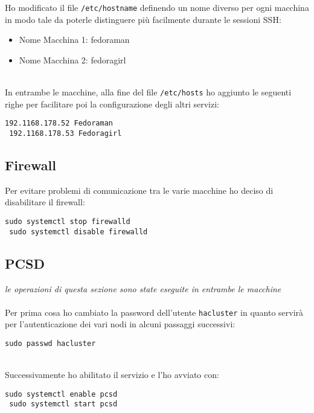 Ho modificato il file \lstinline[style=cmd]|/etc/hostname| definendo un nome diverso per ogni macchina in modo tale da poterle distinguere pi\`{u} facilmente durante le sessioni SSH: 

\begin{itemize}
	\item Nome Macchina 1: fedoraman
	\item Nome Macchina 2: fedoragirl
\end{itemize}
\ \\
In entrambe le macchine, alla fine del file \lstinline[style=cmd]|/etc/hosts| ho aggiunto le seguenti righe per facilitare poi la configurazione degli altri servizi:

\begin{lstlisting}[style=cmd]
 192.1168.178.52 Fedoraman
 192.1168.178.53 Fedoragirl
\end{lstlisting}

\subsection{Firewall}

Per evitare problemi di comunicazione tra le varie macchine ho deciso di disabilitare il firewall:

\begin{lstlisting}[style=cmd]
 sudo systemctl stop firewalld
 sudo systemctl disable firewalld
\end{lstlisting}

\subsection{PCSD}
\label{sec:pcsd}
\textit{le operazioni di questa sezione sono state eseguite in entrambe le macchine }\\
\ \\
Per prima cosa ho cambiato la password dell'utente \lstinline[style=cmd]|hacluster| in quanto servir\`{a} per l'autenticazione dei vari nodi in alcuni passaggi successivi:

\begin{lstlisting}[style=cmd]
 sudo passwd hacluster
\end{lstlisting}
\ \\
Successivamente ho abilitato il servizio e l'ho avviato con:

\begin{lstlisting}[style=cmd]
 sudo systemctl enable pcsd
 sudo systemctl start pcsd
\end{lstlisting}
\pagebreak

